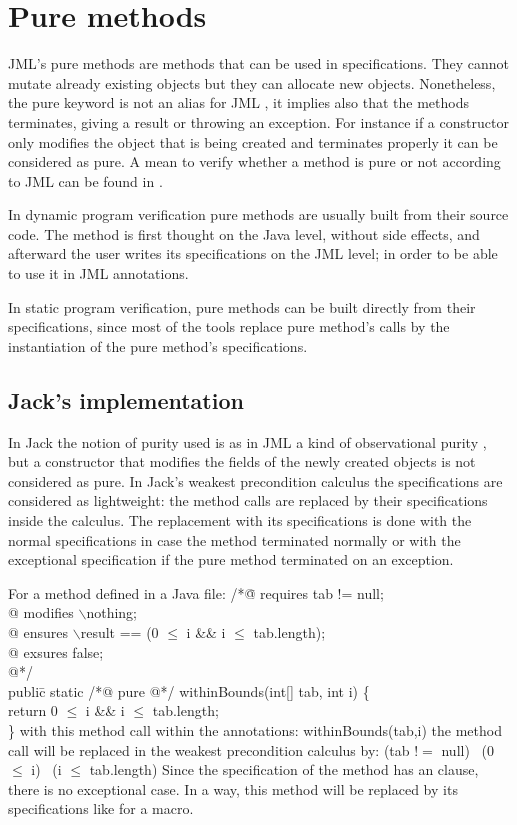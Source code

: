 \section{Pure methods}
JML's pure methods are methods that can be used in specifications.
They cannot mutate already existing objects but they can allocate new objects.
Nonetheless, the pure keyword is not an alias for JML 
, 
it implies also that the methods terminates, giving a result or throwing an 
exception.
For instance if a constructor only modifies the object that is being 
created and terminates properly
it can be considered as pure.
A mean to verify whether a method is pure or not according to JML
can be found in \cite{salcianu05}. 



In dynamic program verification pure methods are usually built from 
their source code. 
The method is first thought on the Java level, without side effects, 
and afterward the user writes its specifications on the JML level; 
in order to be able to use it in JML annotations.

In static program verification,  pure methods can be built directly
from their specifications, since most of the tools replace pure method's calls 
 by the instantiation of the pure method's specifications.


\subsection{Jack's implementation}
In Jack the notion of purity used is as in JML a kind of observational 
purity \cite{naumann05}, but a constructor that modifies the fields 
of the newly created objects is not considered as pure.
In Jack's weakest precondition calculus the specifications are considered 
as lightweight: the method calls are replaced by their specifications 
inside the calculus.
The replacement with its specifications is done with the normal 
specifications in case the method terminated normally or with the 
exceptional specification if the pure method terminated on an exception.
 
For a method defined in a Java file: 
\btab
 /*\=@ requires tab != null;\+\\
  @  modifies $\backslash$nothing;\\
  @ ensures   $\backslash$result == (0 $\le$ i \&\& i $\le$ tab.length);\\
  @ exsures false;\\
  @*/\-\\
publi\=c static /*@ pure @*/  withinBounds(int[] tab, int i) \{\+\\
       return 0 $\le$ i \&\& i $\le$ tab.length;\-\\
\}
\etab
with this method call within the annotations: 
\btab
withinBounds(tab,i)
\etab
the method call will be replaced in the weakest precondition calculus by:
\btab
(tab $!=$ null) \rarrow \ (0 $\le$ i) \conj \ (i $\le$ tab.length)
\etab
Since the specification
of the method has an  clause, there is no exceptional case.
In a way, this method will be replaced by its specifications like for a macro.



